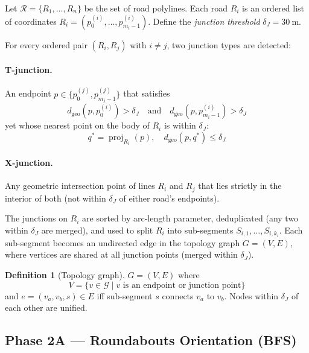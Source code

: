 \documentclass[12pt,a4paper]{article}
\theoremstyle{definition}
\newtheorem{definition}{Definition}[section]
\theoremstyle{plain}
\theoremstyle{remark}
\DeclareMathOperator{\proj}{proj}
\begin{document}
Let $\mathcal{R} = \{R_1, \ldots, R_n\}$ be the set of road polylines.
Each road $R_i$ is an ordered list of coordinates
$R_i = (p_0^{(i)}, \ldots, p_{m_i-1}^{(i)})$.
Define the \emph{junction threshold} $\delta_J = 30\ \mathrm{m}$.

For every ordered pair $(R_i, R_j)$ with $i \neq j$, two junction types are detected:

\paragraph{T-junction.}
An endpoint $p \in \{p_0^{(j)}, p_{m_j-1}^{(j)}\}$ that satisfies
\[
  d_{\text{geo}}(p, p_0^{(i)}) > \delta_J
  \quad\text{and}\quad
  d_{\text{geo}}(p, p_{m_i-1}^{(i)}) > \delta_J
\]
yet whose nearest point
on the body of $R_i$ is within $\delta_J$:
\begin{equation}
  q^* = \proj_{R_i}(p), \quad d_{\text{geo}}(p, q^*) \leq \delta_J
  \label{eq:t_junction}
\end{equation}

\paragraph{X-junction.}
Any geometric intersection point of lines $R_i$ and $R_j$ that lies strictly
in the interior of both (not within $\delta_J$ of either road's endpoints).

The junctions on $R_i$ are sorted by arc-length parameter, deduplicated
(any two within $\delta_J$ are merged), and used to split $R_i$ into
sub-segments $S_{i,1}, \ldots, S_{i,k_i}$. Each sub-segment becomes an
undirected edge in the topology graph $G = (V, E)$, where vertices are
shared at all junction points (merged within $\delta_J$).

\begin{definition}[Topology graph]
$G = (V, E)$ where
\begin{equation*}
  V = \{v \in \mathcal{G} \mid v \text{ is an endpoint or junction point}\}
\end{equation*}
and $e = (v_a, v_b, s) \in E$ iff sub-segment $s$ connects $v_a$ to $v_b$.
Nodes within $\delta_J$ of each other are unified.
\end{definition}

\subsection{Phase 2A — Roundabouts Orientation (BFS)}
\end{document}
